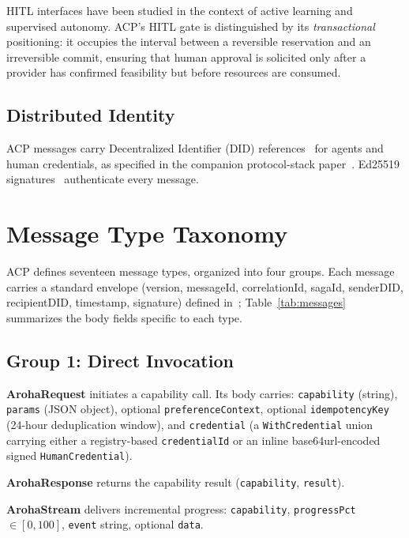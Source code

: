 \documentclass[conference]{IEEEtran}
\begin{document}
HITL interfaces have been studied in the context of active
learning and supervised autonomy.  ACP's HITL gate is distinguished
by its \emph{transactional} positioning: it occupies the interval
between a reversible reservation and an irreversible commit, ensuring
that human approval is solicited only after a provider has confirmed
feasibility but before resources are consumed.

\subsection{Distributed Identity}

ACP messages carry Decentralized Identifier (DID)
references~\cite{w3c2022did} for agents and human credentials,
as specified in the companion protocol-stack paper~\cite{aroha2025p5}.
Ed25519 signatures~\cite{bernstein2011ed25519,josefsson2017ed25519rfc}
authenticate every message.

\section{Message Type Taxonomy}
\label{sec:messages}

ACP defines seventeen message types, organized into four groups.
Each message carries a standard envelope (version, messageId,
correlationId, sagaId, senderDID, recipientDID, timestamp, signature)
defined in~\cite{aroha2025p5}; Table~\ref{tab:messages} summarizes the
body fields specific to each type.

\subsection{Group 1: Direct Invocation}

\textbf{ArohaRequest} initiates a capability call.  Its body
carries: \texttt{capability} (string), \texttt{params} (JSON object),
optional \texttt{preferenceContext}, optional \texttt{idempotencyKey}
(24-hour deduplication window), and \texttt{credential}
(a \texttt{WithCredential} union carrying either a registry-based
\texttt{credentialId} or an inline base64url-encoded signed
\texttt{HumanCredential}).

\textbf{ArohaResponse} returns the capability result (\texttt{capability},
\texttt{result}).

\textbf{ArohaStream} delivers incremental progress: \texttt{capability},
\texttt{progressPct} $\in [0, 100]$, \texttt{event} string,
optional \texttt{data}.
\end{document}
